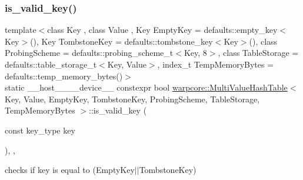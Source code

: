 \subsubsection{\texorpdfstring{is\+\_\+valid\+\_\+key()}{is\_valid\_key()}}
{\footnotesize\ttfamily template$<$class Key , class Value , Key Empty\+Key = defaults\+::empty\+\_\+key$<$\+Key$>$(), Key Tombstone\+Key = defaults\+::tombstone\+\_\+key$<$\+Key$>$(), class Probing\+Scheme  = defaults\+::probing\+\_\+scheme\+\_\+t$<$\+Key, 8$>$, class Table\+Storage  = defaults\+::table\+\_\+storage\+\_\+t$<$\+Key, Value$>$, index\+\_\+t Temp\+Memory\+Bytes = defaults\+::temp\+\_\+memory\+\_\+bytes()$>$ \\
static \+\_\+\+\_\+host\+\_\+\+\_\+\+\_\+\+\_\+device\+\_\+\+\_\+ constexpr bool \hyperlink{classwarpcore_1_1MultiValueHashTable}{warpcore\+::\+Multi\+Value\+Hash\+Table}$<$ Key, Value, Empty\+Key, Tombstone\+Key, Probing\+Scheme, Table\+Storage, Temp\+Memory\+Bytes $>$\+::is\+\_\+valid\+\_\+key (\begin{DoxyParamCaption}\item[{const key\+\_\+type}]{key }\end{DoxyParamCaption})\hspace{0.3cm}{\ttfamily [inline]}, {\ttfamily [static]}, {\ttfamily [noexcept]}}



checks if {\ttfamily key} is equal to {\ttfamily }(Empty\+Key$\vert$$\vert$\+Tombstone\+Key) 

